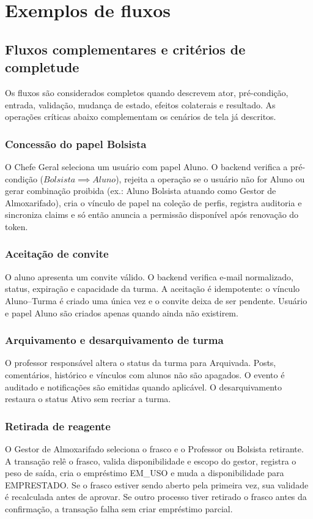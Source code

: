 \newpage
\section{Exemplos de fluxos}

\subsection{Fluxos complementares e critérios de completude}
Os fluxos são considerados completos quando descrevem ator, pré-condição, entrada, validação, mudança de estado, efeitos colaterais e resultado. As operações críticas abaixo complementam os cenários de tela já descritos.

\subsubsection{Concessão do papel Bolsista}
O Chefe Geral seleciona um usuário com papel Aluno. O backend verifica a pré-condição ($Bolsista \implies Aluno$), rejeita a operação se o usuário não for Aluno ou gerar combinação proibida (ex.: Aluno Bolsista atuando como Gestor de Almoxarifado), cria o vínculo de papel na coleção de perfis, registra auditoria e sincroniza claims e só então anuncia a permissão disponível após renovação do token.

\subsubsection{Aceitação de convite}
O aluno apresenta um convite válido. O backend verifica e-mail normalizado, status, expiração e capacidade da turma. A aceitação é idempotente: o vínculo Aluno--Turma é criado uma única vez e o convite deixa de ser pendente. Usuário e papel Aluno são criados apenas quando ainda não existirem.

\subsubsection{Arquivamento e desarquivamento de turma}
O professor responsável altera o status da turma para Arquivada. Posts, comentários, histórico e vínculos com alunos não são apagados. O evento é auditado e notificações são emitidas quando aplicável. O desarquivamento restaura o status Ativo sem recriar a turma.

\subsubsection{Retirada de reagente}
O Gestor de Almoxarifado seleciona o frasco e o Professor ou Bolsista retirante. A transação relê o frasco, valida disponibilidade e escopo do gestor, registra o peso de saída, cria o empréstimo EM\_USO e muda a disponibilidade para EMPRESTADO. Se o frasco estiver sendo aberto pela primeira vez, sua validade é recalculada antes de aprovar. Se outro processo tiver retirado o frasco antes da confirmação, a transação falha sem criar empréstimo parcial.

